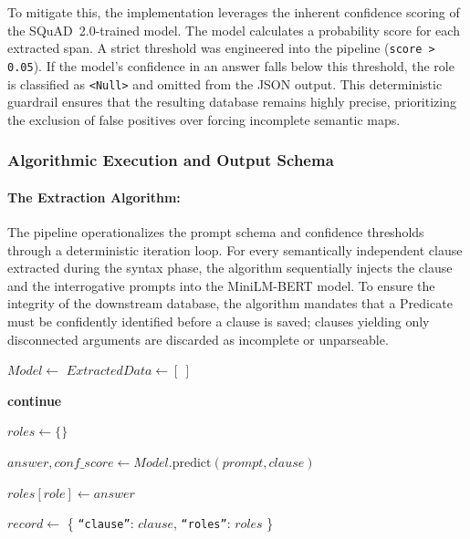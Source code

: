 \documentclass[twoside,final]{hcmut-report}
\begin{document}
\medskip

To mitigate this, the implementation leverages the inherent confidence scoring of the SQuAD~2.0-trained model. The model calculates a probability score for each extracted span. A strict threshold was engineered into the pipeline (\texttt{score > 0.05}). If the model's confidence in an answer falls below this threshold, the role is classified as \texttt{<Null>} and omitted from the JSON output. This deterministic guardrail ensures that the resulting database remains highly precise, prioritizing the exclusion of false positives over forcing incomplete semantic maps.

\subsubsection{Algorithmic Execution and Output Schema}

\paragraph{The Extraction Algorithm:}
The pipeline operationalizes the prompt schema and confidence thresholds through a deterministic iteration loop. For every semantically independent clause extracted during the syntax phase, the algorithm sequentially injects the clause and the interrogative prompts into the MiniLM-BERT model. To ensure the integrity of the downstream database, the algorithm mandates that a Predicate must be confidently identified before a clause is saved; clauses yielding only disconnected arguments are discarded as incomplete or unparseable.
\begin{algorithm}[H]
  \footnotesize
  \caption{QA-SRL: Clause-Level Semantic Role Extraction}
  \begin{algorithmic}[1]
     
    \State $Model \gets$ 
    \State $ExtractedData \gets [\ ]$

    \State \textbf{continue} 
    \EndIf

    \State $roles \gets \{\}$

    \State $answer, conf\_score \gets Model.\text{predict}(prompt, clause)$

     
    \State $roles[role] \gets answer$
    \EndIf
    \EndFor

     
    \State $record \gets$ \{ \texttt{``clause''}: $clause$, \texttt{``roles''}: $roles$ \}
    \State {}
    \EndIf
    \EndFor

    \State \Return {}
    \EndProcedure
  \end{algorithmic}
\end{algorithm}
\end{document}

